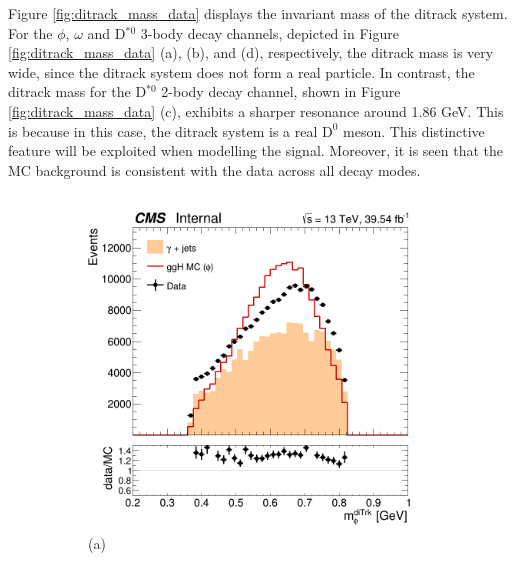 Figure \ref{fig:ditrack_mass_data} displays the invariant mass of the ditrack system. For the $\phi$, $\omega$ and D$^{*0}$ 3-body decay channels, depicted in Figure \ref{fig:ditrack_mass_data} (a), (b), and (d), respectively, the ditrack mass is very wide, since the ditrack system does not form a real particle. In contrast, the ditrack mass for the D$^{*0}$ 2-body decay channel, shown in Figure \ref{fig:ditrack_mass_data} (c), exhibits a sharper resonance around 1.86 GeV. This is because in this case, the ditrack system is a real $\text{D}^{0}$ meson. This distinctive feature will be exploited when modelling the signal. Moreover, it is seen that the MC background is consistent with the data across all decay modes.
\begin{figure}[!ht]
    \captionsetup[subfigure]{labelformat=empty}
    \vspace*{-0.2cm}
    \centering
    \setlength{\mylength}{\textwidth}
    \begin{subfigure}[t]{0.50\mylength}
        \centering
        \includegraphics[width=0.49\mylength]{resources/plots/Phi3_ditrk_mass.png}
        \vspace*{-0.2cm}
        \caption{\footnotesize (a)}
    \end{subfigure}%
    \begin{subfigure}[t]{0.50\mylength}
        \centering

\end{subfigure}
\end{figure}
